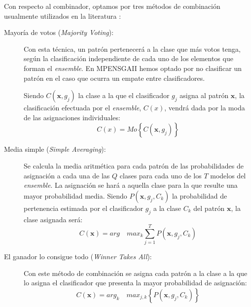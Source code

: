 Con respecto al combinador, optamos por tres métodos de combinación usualmente utilizados
en la literatura \cite{Rokach2009,Theodoridis2006}:
\begin{description}
\item[Mayoría de votos (\textit{Majority Voting}):] Con esta técnica, un patrón
pertenecerá a la clase que más votos tenga, según la clasificación independiente de cada
uno de los elementos que forman el \textit{ensemble}. En MPENSGAII hemos optado
por no clasificar un patrón en el caso que ocurra un
empate entre clasificadores.


Siendo $\displaystyle C(\mathbf{x},g_{j})$ la clase a la que el clasificador $g_{j}$
asigna al patrón $\mathbf{x}$, la clasificación efectuada por el \textit{ensemble},
$C(x)$, vendrá dada por la moda de las asignaciones individuales:
\begin{displaymath}
C(x)=Mo\left\lbrace C(\mathbf{x},g_{j})\right\rbrace
\end{displaymath}
\item[Media simple (\textit{Simple Averaging}):] Se calcula la media aritmética para
cada patrón de las probabilidades de asignación a cada una de las $Q$ clases para cada
uno de los $T$ modelos del \textit{ensemble}. La asignación se hará a aquella clase para
la que resulte una mayor probabilidad media. Siendo $\displaystyle P\left(
\mathbf{x},g_{j},C_{k}\right)$ la probabilidad de pertenencia estimada por el clasificador $g_{j}$
a la clase $C_{k}$ del patrón $\mathbf{x}$, la clase asignada será:
\begin{displaymath}
C(\mathbf{x})= arg \quad max_{k} \sum_{j=1}^T P\left(
\mathbf{x},g_{j},C_{k}\right)
\end{displaymath}
\item[El ganador lo consigue todo (\textit{Winner Takes All}):] Con este método de
combinación se asigna cada patrón a la clase a la que lo asigna el clasificador que
presenta la mayor probabilidad de asignación:
\begin{displaymath}
C(\mathbf{x})= arg_{k} \quad max_{j,k}\left\lbrace P\left(
\mathbf{x},g_{j},C_{k}\right) \right\rbrace
\end{displaymath}
\end{description}

